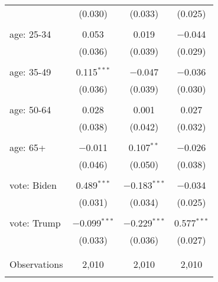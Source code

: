 \begin{tabular}{@{\extracolsep{5pt}}lccc}
  & (0.030) & (0.033) & (0.025) \\ 
  & & & \\ 
 age: 25-34 & 0.053 & 0.019 & $-$0.044 \\ 
  & (0.036) & (0.039) & (0.029) \\ 
  & & & \\ 
 age: 35-49 & 0.115$^{***}$ & $-$0.047 & $-$0.036 \\ 
  & (0.036) & (0.039) & (0.030) \\ 
  & & & \\ 
 age: 50-64 & 0.028 & 0.001 & 0.027 \\ 
  & (0.038) & (0.042) & (0.032) \\ 
  & & & \\ 
 age: 65+ & $-$0.011 & 0.107$^{**}$ & $-$0.026 \\ 
  & (0.046) & (0.050) & (0.038) \\ 
  & & & \\ 
 vote: Biden & 0.489$^{***}$ & $-$0.183$^{***}$ & $-$0.034 \\ 
  & (0.031) & (0.034) & (0.025) \\ 
  & & & \\ 
 vote: Trump & $-$0.099$^{***}$ & $-$0.229$^{***}$ & 0.577$^{***}$ \\ 
  & (0.033) & (0.036) & (0.027) \\ 
  & & & \\ 
\hline \\[-1.8ex] 

Observations & 2,010 & 2,010 & 2,010 \\ 
\hline 
\hline \\[-1.8ex] 
\end{tabular} 